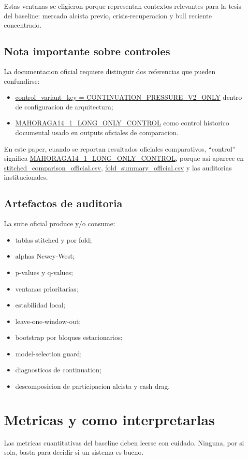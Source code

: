 \documentclass[11pt,letterpaper]{article}
\newcommand{\code}[1]{{\urlstyle{tt}\url{#1}}}
\newcommand{\historicalcontrol}{\code{MAHORAGA14_1_LONG_ONLY_CONTROL}}
\begin{document}
Estas ventanas se eligieron porque representan contextos relevantes para la tesis del baseline: mercado alcista previo, crisis-recuperacion y bull reciente concentrado.

\subsection{Nota importante sobre controles}
La documentacion oficial requiere distinguir dos referencias que pueden confundirse:
\begin{itemize}
    \item \code{control\_variant\_key = CONTINUATION\_PRESSURE\_V2\_ONLY} dentro de configuracion de arquitectura;
    \item \historicalcontrol{} como control historico documental usado en outputs oficiales de comparacion.
\end{itemize}

En este paper, cuando se reportan resultados oficiales comparativos, \enquote{control} significa \historicalcontrol, porque asi aparece en \code{stitched\_comparison\_official.csv}, \code{fold\_summary\_official.csv} y las auditorias institucionales.

\subsection{Artefactos de auditoria}
La suite oficial produce y/o consume:
\begin{itemize}
    \item tablas stitched y por fold;
    \item alphas Newey-West;
    \item p-values y q-values;
    \item ventanas prioritarias;
    \item estabilidad local;
    \item leave-one-window-out;
    \item bootstrap por bloques estacionarios;
    \item model-selection guard;
    \item diagnosticos de continuation;
    \item descomposicion de participacion alcista y cash drag.
\end{itemize}

\section{Metricas y como interpretarlas}
Las metricas cuantitativas del baseline deben leerse con cuidado. Ninguna, por si sola, basta para decidir si un sistema es bueno.
\end{document}
